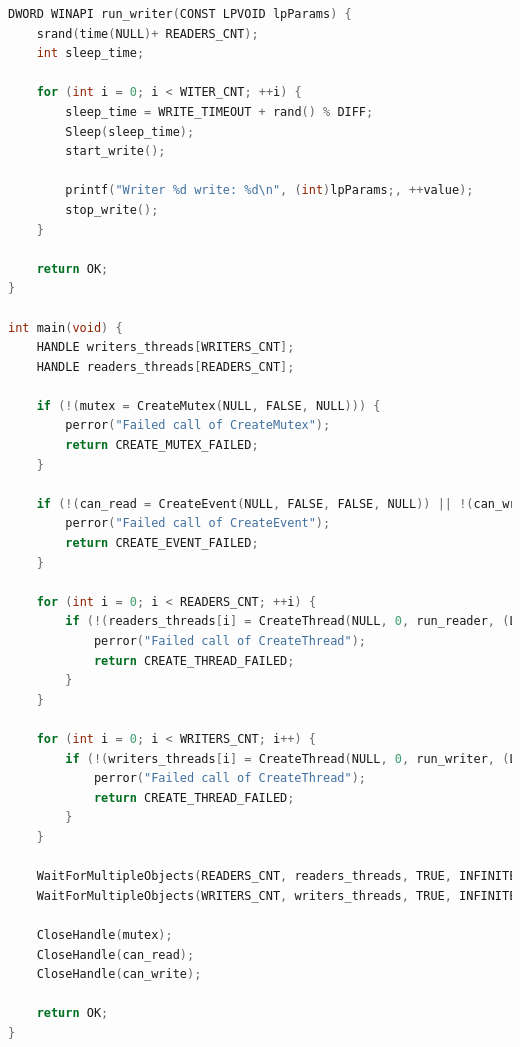 \documentclass[12pt]{report}
\begin{document}
\begin{lstlisting}[label=main,caption=Главный файл программы,language=C]
DWORD WINAPI run_writer(CONST LPVOID lpParams) {
	srand(time(NULL)+ READERS_CNT);
	int sleep_time;
	
	for (int i = 0; i < WITER_CNT; ++i) {
		sleep_time = WRITE_TIMEOUT + rand() % DIFF;
		Sleep(sleep_time);
		start_write();

		printf("Writer %d write: %d\n", (int)lpParams;, ++value);
		stop_write();
	}
	
	return OK;
}

int main(void) {
	HANDLE writers_threads[WRITERS_CNT];
	HANDLE readers_threads[READERS_CNT];

	if (!(mutex = CreateMutex(NULL, FALSE, NULL))) {
		perror("Failed call of CreateMutex");
		return CREATE_MUTEX_FAILED;
	}

	if (!(can_read = CreateEvent(NULL, FALSE, FALSE, NULL)) || !(can_write = CreateEvent(NULL, FALSE, FALSE, NULL))) {
		perror("Failed call of CreateEvent");
		return CREATE_EVENT_FAILED;
	}

	for (int i = 0; i < READERS_CNT; ++i) {
		if (!(readers_threads[i] = CreateThread(NULL, 0, run_reader, (LPVOID)i, 0, NULL))) {
			perror("Failed call of CreateThread");
			return CREATE_THREAD_FAILED;
		}
	}

	for (int i = 0; i < WRITERS_CNT; i++) {
		if (!(writers_threads[i] = CreateThread(NULL, 0, run_writer, (LPVOID)i, 0, NULL))) {
			perror("Failed call of CreateThread");
			return CREATE_THREAD_FAILED;
		}
	}

	WaitForMultipleObjects(READERS_CNT, readers_threads, TRUE, INFINITE);
	WaitForMultipleObjects(WRITERS_CNT, writers_threads, TRUE, INFINITE);

	CloseHandle(mutex);
	CloseHandle(can_read);
	CloseHandle(can_write);
	
	return OK;
}
\end{lstlisting}




\end{document}

